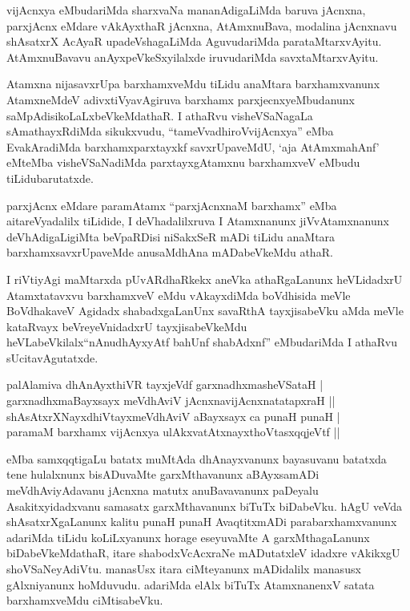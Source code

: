 \begin{artha}
vijAcnxya eMbudariMda sharxvaNa mananAdigaLiMda baruva jAcnxna, parxjAcnx eMdare vAkAyxthaR jAcnxna, AtAmxnuBava, modalina jAcnxnavu shAsatxrX AcAyaR upadeVshagaLiMda AguvudariMda parataMtarxvAyitu. AtAmxnuBavavu anAyxpeVkeSxyilalxde iruvudariMda savxtaMtarxvAyitu.
\end{artha}


\begin{artha}
Atamxna nijasavxrUpa barxhamxveMdu tiLidu anaMtara barxhamxvanunx AtamxneMdeV adivxtiVyavAgiruva barxhamx parxjecnxyeMbudanunx saMpAdisikoLaLxbeVkeMdathaR. I athaRvu visheVSaNagaLa sAmathayxRdiMda sikukxvudu, ``tameVvadhiroVvijAcnxya'' eMba EvakAradiMda barxhamxparxtayxkf savxrUpaveMdU, `aja AtAmxmahAnf' eMteMba visheVSaNadiMda parxtayxgAtamxnu barxhamxveV eMbudu tiLidubarutatxde. 
\end{artha}


\begin{artha}
parxjAcnx eMdare paramAtamx ``parxjAcnxnaM barxhamx'' eMba aitareVyadalilx tiLidide, I deVhadalilxruva I Atamxnanunx jiVvAtamxnanunx deVhAdigaLigiMta beVpaRDisi niSakxSeR mADi tiLidu anaMtara barxhamxsavxrUpaveMde anusaMdhAna mADabeVkeMdu athaR.

I riVtiyAgi maMtarxda pUvARdhaRkekx aneVka athaRgaLanunx heVLidadxrU Atamxtatavxvu barxhamxveV eMdu vAkayxdiMda boVdhisida meVle BoVdhakaveV Agidadx shabadxgaLanUnx savaRthA tayxjisabeVku aMda meVle kataRvayx beVreyeVnidadxrU tayxjisabeVkeMdu heVLabeVkilalx\break ``nAnudhAyxyAtf bahUnf shabAdxnf'' eMbudariMda I athaRvu sUcitavAgutatxde.
\end{artha}

\begin{shl}
palAlamiva dhAnAyxthiVR tayxjeVdf garxnadhxmasheVSataH |\\
garxnadhxmaBayxsayx meVdhAviV jAcnxnavijAcnxnatatapxraH ||\\
shAsAtxrXNayxdhiVtayxmeVdhAviV aBayxsayx ca punaH punaH |\\
paramaM barxhamx vijAcnxya ulAkxvatAtxnayxthoVtasxqqjeVtf ||
\end{shl}

\begin{artha}
eMba samxqqtigaLu batatx muMtAda dhAnayxvanunx bayasuvanu batatxda tene hulalxnunx bisADuvaMte garxMthavanunx aBAyxsamADi meVdhAviyAdavanu jAcnxna matutx anuBavavanunx paDeyalu Asakitxyidadxvanu samasatx garxMthavanunx biTuTx biDabeVku. hAgU veVda shAsatxrXgaLanunx kalitu punaH punaH AvaqtitxmADi parabarxhamxvanunx adariMda tiLidu koLiLxyanunx horage eseyuvaMte A garxMthagaLanunx biDabeVkeMdathaR, itare shabodxVcAcxraNe mADutatxleV idadxre vAkikxgU shoVSaNeyAdiVtu. manasUsx itara ciMteyanunx mADidalilx manasusx gAlxniyanunx hoMduvudu. adariMda elAlx biTuTx AtamxnanenxV satata barxhamxveMdu ciMtisabeVku.
\end{artha}

